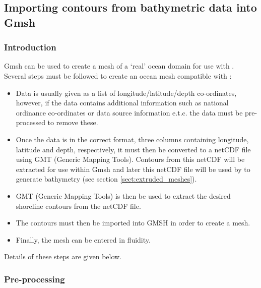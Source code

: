 \subsection{Importing contours from bathymetric data into Gmsh}

\subsubsection{Introduction}

Gmsh can be used to create a mesh of a `real' ocean domain for use with \fluidity. Several steps must be followed
to create an ocean mesh compatible with \fluidity:

\begin{itemize}

\item Data is usually given as a list of longitude/latitude/depth co-ordinates, however, if the data 
contains additional information such as national ordinance co-ordinates or data source information e.t.c. 
the data must be pre-processed to remove these.

\item Once the data is in the correct format, three columns containing longitude, latitude and depth, respectively, 
it must then be converted to a netCDF file using GMT (Generic Mapping Tools). Contours from this netCDF will be
extracted for use within Gmsh and later this netCDF file will be used by \fluidity to generate bathymetry
(see section \ref{sect:extruded_meshes}).

\item GMT (Generic Mapping Tools) is then be used to extract the desired shoreline contours from the netCDF file. 

\item The contours must then be imported into GMSH in order to create a mesh.

\item Finally, the mesh can be entered in fluidity.

\end{itemize}

Details of these steps are given below.

\subsubsection{Pre-processing}

